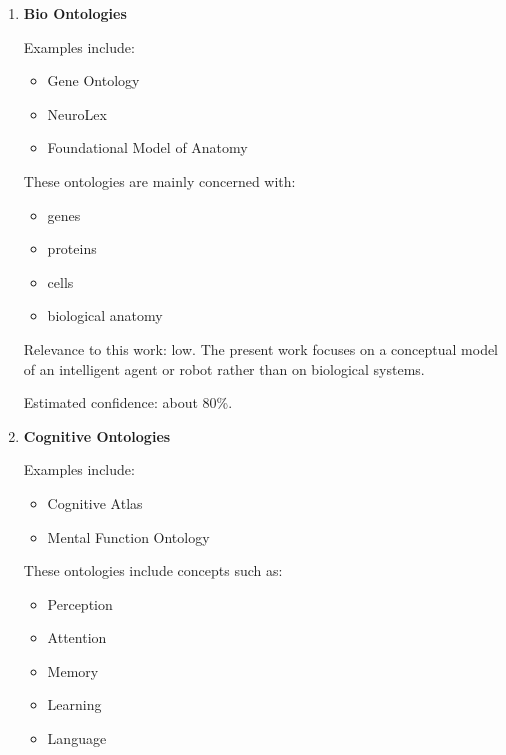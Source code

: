 \documentclass[a4paper]{article}
\title{}
\date{}
\begin{document}
    \maketitle
    \begin{enumerate}

        \item \textbf{Bio Ontologies}
        
        Examples include:
        
        \begin{itemize}
            \item Gene Ontology
            \item NeuroLex
            \item Foundational Model of Anatomy
        \end{itemize}
        
        These ontologies are mainly concerned with:
        
        \begin{itemize}
            \item genes
            \item proteins
            \item cells
            \item biological anatomy
        \end{itemize}
        
        Relevance to this work: low.
        The present work focuses on a conceptual model of an intelligent agent or robot rather than on biological systems.
        
        Estimated confidence: about 80\%.
        
        \item \textbf{Cognitive Ontologies}
        
        Examples include:
        
        \begin{itemize}
            \item Cognitive Atlas
            \item Mental Function Ontology
        \end{itemize}
        
        These ontologies include concepts such as:
        
        \begin{itemize}
            \item Perception
            \item Attention
            \item Memory
            \item Learning
            \item Language
        \end{itemize}
        

\end{enumerate}
\end{document}

